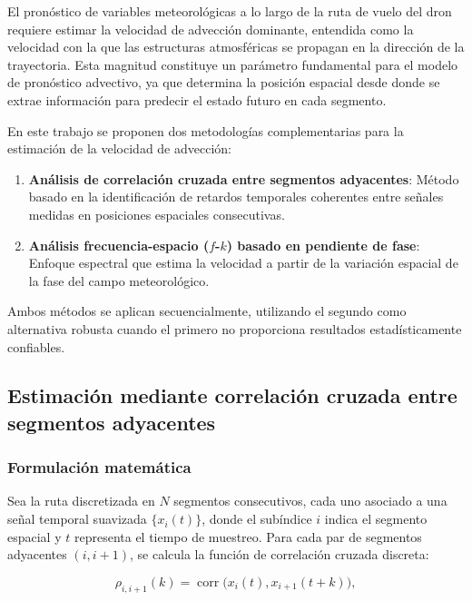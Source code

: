 \documentclass[
  spanish,
  us-letterpaper,
]{scrreprt}
\numberwithin{equation}{section}
\begin{document}
El pronóstico de variables meteorológicas a lo largo de la ruta de vuelo
del dron requiere estimar la velocidad de advección dominante, entendida
como la velocidad con la que las estructuras atmosféricas se propagan en
la dirección de la trayectoria. Esta magnitud constituye un parámetro
fundamental para el modelo de pronóstico advectivo, ya que determina la
posición espacial desde donde se extrae información para predecir el
estado futuro en cada segmento.

En este trabajo se proponen dos metodologías complementarias para la
estimación de la velocidad de advección:

\begin{enumerate}
\def\labelenumi{\arabic{enumi}.}
\item
  \textbf{Análisis de correlación cruzada entre segmentos adyacentes}:
  Método basado en la identificación de retardos temporales coherentes
  entre señales medidas en posiciones espaciales consecutivas.
\item
  \textbf{Análisis frecuencia-espacio (\(f\)-\(k\)) basado en pendiente
  de fase}: Enfoque espectral que estima la velocidad a partir de la
  variación espacial de la fase del campo meteorológico.
\end{enumerate}

Ambos métodos se aplican secuencialmente, utilizando el segundo como
alternativa robusta cuando el primero no proporciona resultados
estadísticamente confiables.

\subsection{Estimación mediante correlación cruzada entre segmentos
adyacentes}\label{estimaciuxf3n-mediante-correlaciuxf3n-cruzada-entre-segmentos-adyacentes}

\subsubsection{Formulación
matemática}\label{formulaciuxf3n-matemuxe1tica}

Sea la ruta discretizada en \(N\) segmentos consecutivos, cada uno
asociado a una señal temporal suavizada \(\{x_i(t)\}\), donde el
subíndice \(i\) indica el segmento espacial y \(t\) representa el tiempo
de muestreo. Para cada par de segmentos adyacentes \((i, i+1)\), se
calcula la función de correlación cruzada discreta:

\[
\rho_{i,i+1}(k) = \operatorname{corr}\big(x_i(t), x_{i+1}(t+k)\big),
\]
\end{document}
